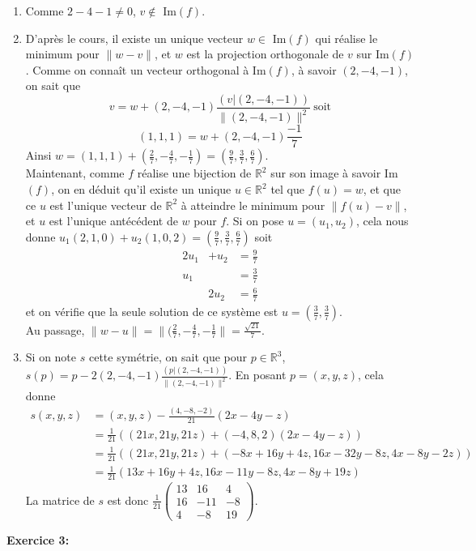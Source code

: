 \documentclass[a4paper, 11pt]{article}
\theoremstyle{plain}
\newcommand{\R}{\mathbb{R}}
\begin{document}
\begin{enumerate}
\item Comme 
$2-4-1 \neq 0$, $v\notin $ Im$(f)$.
\item D'après le cours, il existe un unique vecteur $w \in$ Im$(f)$ qui réalise le 
minimum pour 
$\|w-v\|$, et $w$ est la projection orthogonale de $v$ sur 
Im$(f)$. Comme on connaît un vecteur orthogonal à 
Im$(f)$, à savoir 
$(2,-4,-1)$, on sait que 
\[
v = w + (2,-4,-1) \frac{(v| (2,-4,-1))}{\|(2,-4,-1)\|^2} \ \text{soit} \]
\[
(1,1,1) = w + (2,-4,-1)\frac{-1}{7} \]
Ainsi 
$w = (1,1,1) + (\frac{2}{7}, -\frac{4}{7} , -\frac{1}{7}) = (\frac{9}{7},\frac{3}{7},\frac{6}{7})$. \\
Maintenant, comme $f$ réalise une bijection de 
$\R^2$ sur son image à savoir Im$(f)$, on en déduit qu'il existe un unique 
$u\in \R^2$ tel que $f(u)=w$, et que ce $u$ est l'unique vecteur de $\R^2$ à 
atteindre le minimum pour 
$\|f(u)-v\|$, et $u$ est l'unique antécédent de $w$ pour $f$.
Si on pose $u=(u_1,u_2)$, cela nous donne 
$u_1(2,1,0) + u_2(1,0,2) = ( \frac{9}{7},\frac{3}{7},\frac{6}{7})$ soit 
\[ \begin{matrix}
2u_1 & +u_2 & =\frac{9}{7}\\
u_1 &&=\frac{3}{7}\\
 & 2u_2 & =\frac{6}{7}
 \end{matrix}\]
 et on vérifie que la seule solution de ce système est 
 $u=(\frac{3}{7},\frac{3}{7})$.\\
 Au passage, $\|w-u\| = \|( \frac{2}{7}, -\frac{4}{7}, -\frac{1}{7} \| = \frac{\sqrt{21}}{7}$.
\item 
Si on note $s$ cette symétrie, on sait que pour 
$p\in \R^3$, 
$s(p) = p-2 (2,-4,-1) \frac{(p| (2,-4,-1))}{\|(2,-4,-1)\|^2}$. 
En posant 
$p=(x,y,z)$, cela donne \\
\begin{align*}
s(x,y,z) &= (x,y,z) - \frac{(4,-8,-2)}{21}(2x-4y-z) \\
       & = \frac{1}{21} ( 
(21x,21y,21z) + (-4,8,2)(2x-4y-z) )  \\
 &=\frac{1}{21} ( 
(21x,21y,21z) +( -8x+16y+4z,16x-32y-8z, 4x-8y-2z) ) \\
&= \frac{1}{21} ( 13x +16y+4z, 16x -11y-8z, 4x-8y+19z ) 
\end{align*}
La matrice de $s$ est donc 
$\frac{1}{21}
\begin{pmatrix}
13 & 16&4\\
16&-11&-8\\
4&-8&19
\end{pmatrix}$.

\end{enumerate}
\medskip
\noindent
\textbf{Exercice 3:}\\
\end{document}
